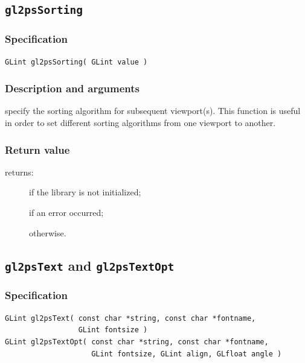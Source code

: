 \subsection{\texttt{gl2psSorting}}
\label{sec:gl2psSorting}

\subsubsection{Specification}

\begin{verbatim}
GLint gl2psSorting( GLint value )
\end{verbatim}

\subsubsection{Description and arguments}

 specify the sorting algorithm for subsequent viewport(s).
This function is useful in order to set different sorting algorithms
from one viewport to another.

\subsubsection{Return value}

\noindent{} returns:
\begin{description}
\item[] if the library is not initialized;
\item[] if an error occurred;
\item[] otherwise.
\end{description}

\subsection{\texttt{gl2psText} and \texttt{gl2psTextOpt}}
\label{sec:gl2psText}

\subsubsection{Specification}

\begin{verbatim}
GLint gl2psText( const char *string, const char *fontname,
                 GLint fontsize )
GLint gl2psTextOpt( const char *string, const char *fontname,
                    GLint fontsize, GLint align, GLfloat angle )
\end{verbatim}

